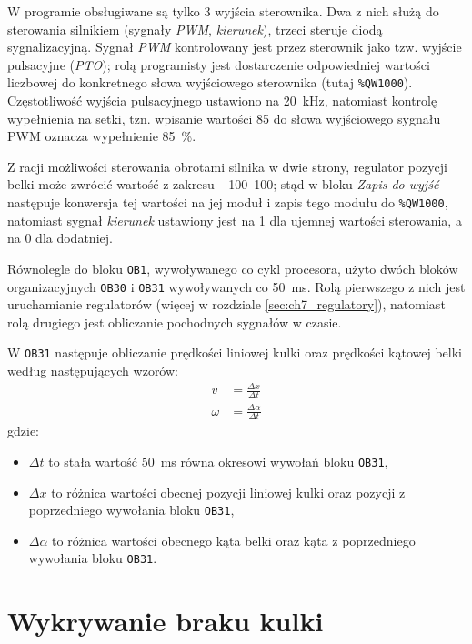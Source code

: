 W programie obsługiwane są tylko \num{3} wyjścia sterownika. Dwa z nich służą do sterowania silnikiem (sygnały \textit{PWM}, \textit{kierunek}), trzeci steruje diodą sygnalizacyjną. Sygnał \textit{PWM} kontrolowany jest przez sterownik jako tzw. wyjście pulsacyjne (\textit{PTO}); rolą programisty jest dostarczenie odpowiedniej wartości liczbowej do konkretnego słowa wyjściowego sterownika (tutaj \texttt{\%QW1000}). Częstotliwość wyjścia pulsacyjnego ustawiono na \SI{20}{\kilo\hertz}, natomiast kontrolę wypełnienia na setki, tzn. wpisanie wartości \num{85} do słowa wyjściowego sygnału PWM oznacza wypełnienie \SI{85}{\percent}.

Z racji możliwości sterowania obrotami silnika w dwie strony, regulator pozycji belki może zwrócić wartość z zakresu \numrange[range-phrase={ do }]{-100}{100}; stąd w bloku \textit{Zapis do wyjść} następuje konwersja tej wartości na jej moduł i zapis tego modułu do \texttt{\%QW1000}, natomiast sygnał \textit{kierunek} ustawiony jest na \num{1} dla ujemnej wartości sterowania, a na \num{0} dla dodatniej.

Równolegle do bloku \texttt{OB1}, wywoływanego co cykl procesora, użyto dwóch bloków organizacyjnych \texttt{OB30} i \texttt{OB31} wywoływanych co \SI{50}{\milli\second}. Rolą pierwszego z nich jest uruchamianie regulatorów (więcej w rozdziale \ref{sec:ch7_regulatory}), natomiast rolą drugiego jest obliczanie pochodnych sygnałów w czasie.

W \texttt{OB31} następuje obliczanie prędkości liniowej kulki oraz prędkości kątowej belki według następujących wzorów:
\begin{align*}
    v &= \frac{\Delta x}{\Delta t} \\
    \omega &= \frac{\Delta \alpha}{\Delta t}
\end{align*}
gdzie:
\begin{itemize}
    \item $\Delta t$ to stała wartość \SI{50}{\milli\second} równa okresowi wywołań bloku \texttt{OB31},
    \item $\Delta x$ to różnica wartości obecnej pozycji liniowej kulki oraz pozycji z poprzedniego wywołania bloku \texttt{OB31},
    \item $\Delta \alpha$ to różnica wartości obecnego kąta belki oraz kąta z poprzedniego wywołania bloku \texttt{OB31}.
\end{itemize}

\section{Wykrywanie braku kulki}
\label{sec:ch7_wykrywanie_braku_kulki}

